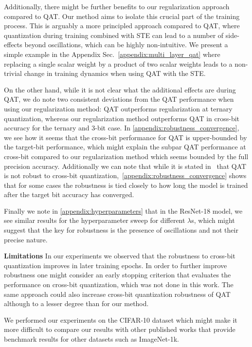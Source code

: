 Additionally, there might be further benefits to our regularization approach compared to QAT. Our method aims to isolate this crucial part of the training process. This is arguably a more principled approach compared to QAT, where quantization during training combined with STE can lead to a number of side-effects beyond oscillations, which can be highly non-intuitive. We present a simple example in the Appendix Sec.~\ref{appendix:multi_layer_qat} where replacing a single scalar weight by a product of two scalar weights leads to a non-trivial change in training dynamics when using QAT with the STE.

On the other hand, while it is not clear what the additional effects are during QAT, we do note two consistent deviations from the QAT performance when using our regularization method: QAT outperforms regularization at ternary quantization, whereas our regularization method outperforms QAT in cross-bit accuracy for the ternary and 3-bit case. In \ref{appendix:robustness_convergence}, we see how it seems that the cross-bit performance for QAT is upper-bounded by the target-bit performance, which might explain the subpar QAT performance at cross-bit compared to our regularization method which seems bounded by the full precision accuracy. Additionally we can note that while it is stated in~\citet{alizadeh2020gradient, OneModelRobust} that QAT is not robust to cross-bit quantization,~\ref{appendix:robustness_convergence} shows that for some cases the robustness is tied closely to how long the model is trained after the target bit accuracy has converged. 

Finally we note in \ref{appendix:hyperparameters} that in the ResNet-18 model, we see similar results for the hyperparameter sweep for different $\lambda$s, which might suggest that the key for robustness is the presence of oscillations and not their precise nature.

{\bf Limitations} In our experiments we observed that the robustness to cross-bit quantization improves in later training epochs. In order to further improve robustness one might consider an early stopping criterion that evaluates the performance on cross-bit quantization, which was not done in this work. The same approach could also increase cross-bit quantization robustness of QAT although to a lesser degree than for our method. 

We performed our experiments on the CIFAR-10 dataset which might make it more difficult to compare our results with other published works that provide benchmark results for other datasets such as ImageNet-1k.

